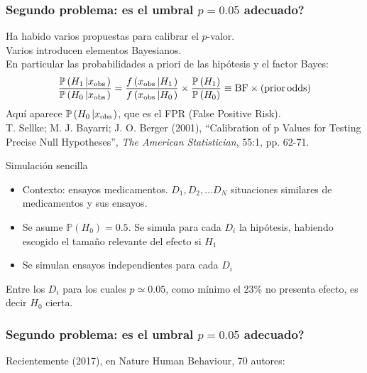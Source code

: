 \documentclass[9pt]{beamer}
\newcommand{\field}[1]{\mathbb{#1}}
\renewcommand{\P}{\field{P}}
\begin{document}
\begin{frame}
  \frametitle{Segundo problema: es el umbral $p = 0.05$ adecuado?}
  Ha habido varios propuestas para  calibrar el $p$-valor.\\
  Varios introducen elementos Bayesianos.\\
  En particular las probabilidades a priori de las hipótesis y el
  factor Bayes: 
  $$\frac{\P\left({H}_{1}\left|{x}_{{\rm{obs}}}\right.\right)}{\P\left({H}_{0}\left|{x}_{{\rm{obs}}}\right.\right)}=\frac{f\left({x}_{{\rm{obs}}}\left|{H}_{1}\right.\right)}{f\left({x}_{{\rm{obs}}}\left|{H}_{0}\right.\right)}\times \frac{\P\left({H}_{1}\right)}{\P\left({H}_{0}\right)}\equiv {\rm{BF}}\times \left({\rm{prior}}\,{\rm{odds}}\right)
  $$
  Aquí aparece $\P\left({H}_{0}\left|{x}_{{\rm{obs}}}\right.\right)$,
  que es el FPR (False Positive Risk).\\
  {\scriptsize T. Sellke; M. J. Bayarri; J. O. Berger (2001), ``Calibration of p Values for Testing Precise Null Hypotheses'', \textit{
The American Statistician}, 55:1, pp. 62-71.}
  \begin{block}{Simulación sencilla}
    \begin{itemize}
    \item<7-> Contexto: ensayos medicamentos. $D_1,D_2, \ldots D_N$
      situaciones similares de medicamentos y sus ensayos.
    \item<8-> Se asume $\P(H_0) = 0.5$. Se simula para cada $D_i$ la
      hipótesis, habiendo escogido el tamaño relevante del efecto si $H_1$
    \item<9-> Se simulan ensayos independientes para cada $D_i$ 
    \end{itemize}
     Entre los $D_i$ para los cuales $p\simeq 0.05$, como
    mínimo el 23\% no presenta efecto, es decir $H_0$ cierta.
  \end{block}
\end{frame}
\begin{frame}
  \frametitle{Segundo problema: es el umbral $p = 0.05$ adecuado?}
      \begin{overlayarea}{\textwidth}{\textheight}
    Recientemente (2017), en Nature Human Behaviour, 70 autores:\\
      \begin{center}
    \end{center}
  \end{overlayarea}
\end{frame}
\end{document}
